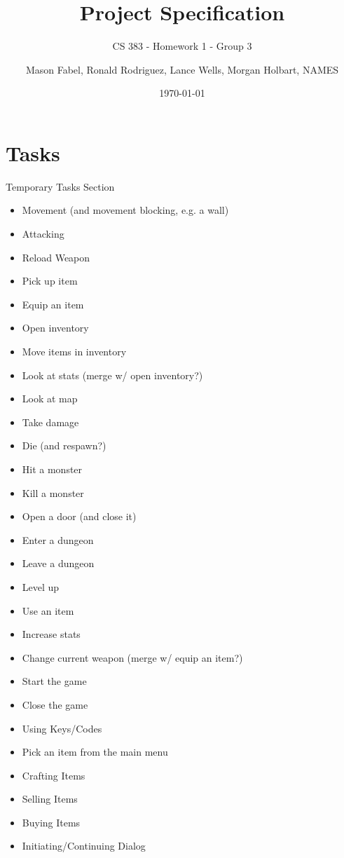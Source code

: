 \documentclass[12pt]{report}
\title{Project Specification}
\subtitle{CS 383 - Homework 1 - Group 3}
\author{Mason Fabel, Ronald Rodriguez, Lance Wells, Morgan Holbart, NAMES} %
\date{\today}
\begin{document}
\maketitle


\chapter{Tasks}

\begin{section}{Temporary Tasks Section}

\begin{itemize}
\item	Movement (and movement blocking, e.g. a wall) %
\item	Attacking %
\item	Reload Weapon %
\item	Pick up item %
\item	Equip an item %
\item	Open inventory %
\item	Move items in inventory %
\item	Look at stats (merge w/ open inventory?) %
\item	Look at map %
\item	Take damage %
\item	Die (and respawn?) %
\item	Hit a monster %
\item	Kill a monster %
\item	Open a door (and close it) %
\item	Enter a dungeon %
\item	Leave a dungeon %
\item	Level up %
\item	Use an item %
\item	Increase stats %
\item	Change current weapon (merge w/ equip an item?) %
\item	Start the game %
\item	Close the game %
\item	Using Keys/Codes %
\item	Pick an item from the main menu %
\item	Crafting Items %
\item	Selling Items %
\item	Buying Items %
\item	Initiating/Continuing Dialog %
\end{itemize}


\end{section}
\end{document}
